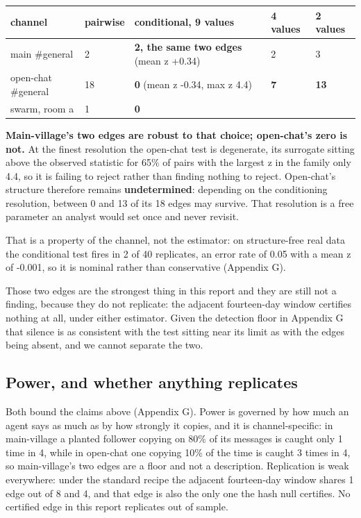 \documentclass[11pt]{article}
\begin{document}
\begin{center}
\small
\begin{tabular}{lllll}
\toprule
\textbf{channel} & \textbf{pairwise} & \textbf{conditional, 9 values} & \textbf{4 values} & \textbf{2 values} \\
\midrule
main \#general & 2 & \textbf{2, the same two edges} (mean z +0.34) & 2 & 3 \\
open-chat \#general & 18 & \textbf{0} (mean z -0.34, max z 4.4) & \textbf{7} & \textbf{13} \\
swarm, room a & 1 & \textbf{0} &  &  \\
\bottomrule
\end{tabular}
\end{center}

\textbf{Main-village's two edges are robust to that choice; open-chat's zero is not.} At the finest resolution the open-chat test is degenerate, its surrogate sitting above the observed statistic for 65\% of pairs with the largest z in the family only 4.4, so it is failing to reject rather than finding nothing to reject. Open-chat's structure therefore remains \textbf{undetermined}: depending on the conditioning resolution, between 0 and 13 of its 18 edges may survive. That resolution is a free parameter an analyst would set once and never revisit.

That is a property of the channel, not the estimator: on structure-free real data the conditional test fires in 2 of 40 replicates, an error rate of 0.05 with a mean z of -0.001, so it is nominal rather than conservative (Appendix G).

Those two edges are the strongest thing in this report and they are still not a finding, because they do not replicate: the adjacent fourteen-day window certifies nothing at all, under either estimator. Given the detection floor in Appendix G that silence is as consistent with the test sitting near its limit as with the edges being absent, and we cannot separate the two.

\subsection{Power, and whether anything replicates}

Both bound the claims above (Appendix G). Power is governed by how much an agent says as much as by how strongly it copies, and it is channel-specific: in main-village a planted follower copying on 80\% of its messages is caught only 1 time in 4, while in open-chat one copying 10\% of the time is caught 3 times in 4, so main-village's two edges are a floor and not a description. Replication is weak everywhere: under the standard recipe the adjacent fourteen-day window shares 1 edge out of 8 and 4, and that edge is also the only one the hash null certifies. No certified edge in this report replicates out of sample.
\end{document}
